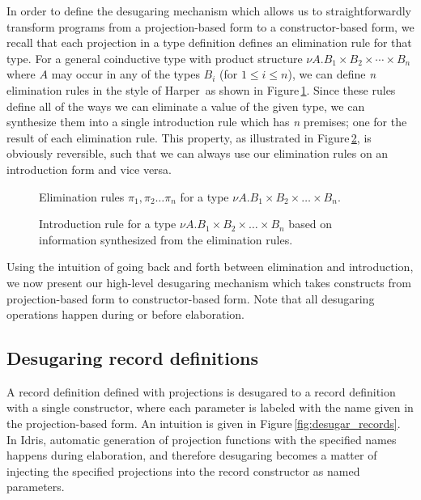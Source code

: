 In order to define the desugaring mechanism which allows us to straightforwardly transform programs from a projection-based form to a constructor-based form, we recall that each projection in a type definition defines an elimination rule for that type. For a general coinductive type with product structure $\nu A. B_1 \times B_2 \times \cdots \times B_n$ where $A$ may occur in any of the types $B_i$ (for $1 \leq i \leq n$), we can define \textit{n} elimination rules in the style of Harper\,\cite[Ch. 15]{Harper:2012} as shown in Figure\,\ref{fig:nuA_elim_rules}. Since these rules define all of the ways we can eliminate a value of the given type, we can synthesize them into a single introduction rule which has \textit{n} premises; one for the result of each elimination rule. This property, as illustrated in Figure\,\ref{fig:nuA_intro_rule}, is obviously reversible, such that we can always use our elimination rules on an introduction form and vice versa.

\begin{figure}
\caption{Elimination rules $\pi_1, \pi_2 \ldots \pi_n$ for a type $\nu A. B_1 \times B_2 \times \ldots \times B_n$.}
\label{fig:nuA_elim_rules}
\end{figure}

\begin{figure}
\caption{Introduction rule for a type $\nu A. B_1 \times B_2 \times \ldots \times B_n$ based on information synthesized from the elimination rules.}
\label{fig:nuA_intro_rule}
\end{figure}

Using the intuition of going back and forth between elimination and introduction, we now present our high-level desugaring mechanism which takes constructs from projection-based form to constructor-based form. Note that all desugaring operations happen during or before elaboration.



\subsection{Desugaring record definitions}

A record definition defined with projections is desugared to a record definition with a single constructor, where each parameter is labeled with the name given in the projection-based form. An intuition is given in Figure\,\ref{fig:desugar_records}. In Idris, automatic generation of projection functions with the specified names happens during elaboration, and therefore desugaring becomes a matter of injecting the specified projections into the record constructor as named parameters.

